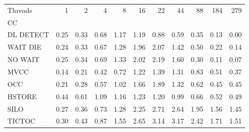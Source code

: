 \begin{tabular}{lrrrrrrrrrr}
\toprule
Threads &  1   &  2   &  4   &  8   &  16  &  22  &  44  &  88  &  184 &  279 \\
CC        &      &      &      &      &      &      &      &      &      &      \\
\midrule
DL DETECT & 0.25 & 0.33 & 0.68 & 1.17 & 1.19 & 0.88 & 0.59 & 0.35 & 0.13 & 0.00 \\
WAIT DIE  & 0.24 & 0.33 & 0.67 & 1.28 & 1.96 & 2.07 & 1.42 & 0.50 & 0.22 & 0.14 \\
NO WAIT   & 0.25 & 0.34 & 0.69 & 1.33 & 2.02 & 2.19 & 1.60 & 0.30 & 0.11 & 0.07 \\
MVCC      & 0.14 & 0.21 & 0.42 & 0.72 & 1.22 & 1.39 & 1.31 & 0.83 & 0.51 & 0.37 \\
OCC       & 0.21 & 0.28 & 0.57 & 1.02 & 1.66 & 1.89 & 1.32 & 0.62 & 0.45 & 0.45 \\
HSTORE    & 0.44 & 0.61 & 1.09 & 1.16 & 1.23 & 1.20 & 0.99 & 0.66 & 0.52 & 0.49 \\
SILO      & 0.27 & 0.36 & 0.73 & 1.28 & 2.25 & 2.71 & 2.64 & 1.95 & 1.56 & 1.45 \\
TICTOC    & 0.30 & 0.43 & 0.87 & 1.55 & 2.65 & 3.14 & 3.17 & 2.42 & 1.71 & 1.51 \\
\bottomrule
\end{tabular}
